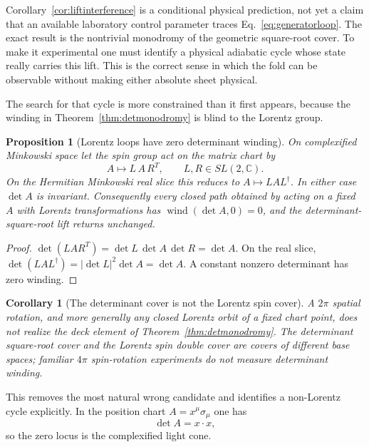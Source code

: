 \documentclass[11pt]{article}
\newtheorem{proposition}[theorem]{Proposition}
\newtheorem{corollary}[theorem]{Corollary}
\theoremstyle{definition}\newtheorem{definition}[theorem]{Definition}
\theoremstyle{remark}\newtheorem{remark}[theorem]{Remark}\newtheorem{conjecture}[theorem]{Conjecture}
\begin{document}
Corollary~\ref{cor:liftinterference} is a conditional physical prediction, not yet a claim that an available laboratory control parameter traces Eq.~\eqref{eq:generatorloop}. The exact result is the nontrivial monodromy of the geometric square-root cover. To make it experimental one must identify a physical adiabatic cycle whose state really carries this lift. This is the correct sense in which the fold can be observable without making either absolute sheet physical.

The search for that cycle is more constrained than it first appears, because the winding in Theorem~\ref{thm:detmonodromy} is blind to the Lorentz group.

\begin{proposition}[Lorentz loops have zero determinant winding]\label{prop:lorentznowind}
On complexified Minkowski space let the spin group act on the matrix chart by
\begin{equation}\label{eq:lorentzchart}
 A\longmapsto L\,A\,R^T,\qquad L,R\in SL(2,\mathbb C).
\end{equation}
On the Hermitian Minkowski real slice this reduces to $A\mapsto LAL^\dagger$. In either case $\det A$ is invariant. Consequently every closed path obtained by acting on a fixed $A$ with Lorentz transformations has $\operatorname{wind}(\det A,0)=0$, and the determinant-square-root lift returns unchanged.
\end{proposition}
\begin{proof}
$\det(LAR^T)=\det L\,\det A\,\det R=\det A$. On the real slice, $\det(LAL^\dagger)=|\det L|^2\det A=\det A$. A constant nonzero determinant has zero winding.
\end{proof}

\begin{corollary}[The determinant cover is not the Lorentz spin cover]\label{cor:notspincover}
A $2\pi$ spatial rotation, and more generally any closed Lorentz orbit of a fixed chart point, does not realize the deck element of Theorem~\ref{thm:detmonodromy}. The determinant square-root cover and the Lorentz spin double cover are covers of different base spaces; familiar $4\pi$ spin-rotation experiments do not measure determinant winding.
\end{corollary}

This removes the most natural wrong candidate and identifies a non-Lorentz cycle explicitly. In the position chart $A=x^\mu\sigma_\mu$ one has
\begin{equation}\label{eq:detisinterval}
 \boxed{\det A=x\cdot x,}
\end{equation}
so the zero locus is the complexified light cone.
\end{document}

